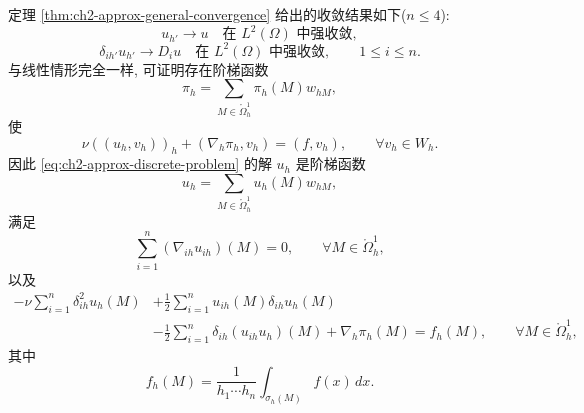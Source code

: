 定理 \ref{thm:ch2-approx-general-convergence} 给出的收敛结果如下($n\leq4$):
\begin{equation}
u_{h'}\longrightarrow u\quad\text{在 }L^2(\Omega)\text{ 中强收敛},
\label{eq:ch2-apx1-solution-strong-l2}
\end{equation}
\begin{equation}
\delta_{ih'}u_{h'}\longrightarrow D_iu
\quad\text{在 }L^2(\Omega)\text{ 中强收敛},
\qquad1\leq i\leq n.
\label{eq:ch2-apx1-solution-strong-derivatives}
\end{equation}
与线性情形完全一样, 可证明存在阶梯函数
\begin{equation}
\pi_h=\sum_{M\in\mathring\Omega_h^1}\pi_h(M)w_{hM},
\label{eq:ch2-apx1-pressure-step-function}
\end{equation}
使
\begin{equation}
\nu((u_h,v_h))_h+(\nabla_h\pi_h,v_h)=(f,v_h),
\qquad\forall v_h\in W_h.
\label{eq:ch2-apx1-pressure-equation}
\end{equation}
因此 \eqref{eq:ch2-approx-discrete-problem} 的解 $u_h$ 是阶梯函数
\begin{equation}
u_h=\sum_{M\in\mathring\Omega_h^1}u_h(M)w_{hM},
\label{eq:ch2-apx1-velocity-step-function}
\end{equation}
满足
\begin{equation}
\sum_{i=1}^{n}(\nabla_{ih}u_{ih})(M)=0,
\qquad\forall M\in\mathring\Omega_h^1,
\label{eq:ch2-apx1-discrete-divergence-free}
\end{equation}
以及
\begin{equation}
\begin{aligned}
-\nu\sum_{i=1}^{n}\delta_{ih}^2u_h(M)
&+\frac12\sum_{i=1}^{n}u_{ih}(M)\delta_{ih}u_h(M)\\
&-\frac12\sum_{i=1}^{n}\delta_{ih}(u_{ih}u_h)(M)
+\nabla_h\pi_h(M)=f_h(M),
\qquad\forall M\in\mathring\Omega_h^1,
\end{aligned}
\label{eq:ch2-apx1-discrete-momentum}
\end{equation}
其中
\begin{equation}
f_h(M)=\frac1{h_1\cdots h_n}\int_{\sigma_h(M)}f(x)\,dx.
\label{eq:ch2-apx1-cell-average-force}
\end{equation}

